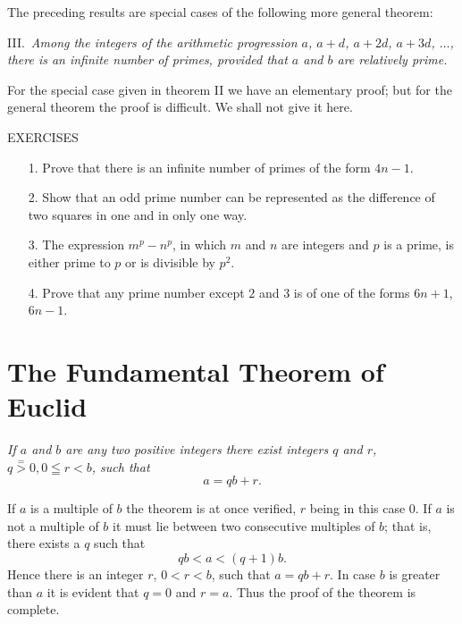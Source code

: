 \documentclass[oneside]{book}
\begin{document}
The preceding results are special cases of the following more
general theorem:

\smallskip III.~\emph{Among the integers of the arithmetic
progression $a$, $a + d$, $a + 2d$, $a + 3d$, $\ldots$, there is an
infinite number of
primes, provided that $a$ and $b$ are relatively prime.}%

For the special case given in theorem II we have an elementary
proof; but for the general theorem the proof is difficult. We shall
not give it here.

\begin{center}
EXERCISES
\end{center}

\small \begin{enumerate}

\item[1.] Prove that there is an infinite number of primes of the
form $4n - 1$.

\item[2.] Show that an odd prime number can be represented as the
difference of two squares in one and in only one way.

\item[3.] The expression $m^p - n^p$, in which $m$ and $n$ are integers
and $p$ is a prime, is either prime to $p$ or is divisible by $p^2$.

\item[4.] Prove that any prime number except $2$ and $3$ is of one of
the forms $6n + 1$, $6n - 1$.
\end{enumerate}\normalsize

\section{The Fundamental Theorem of Euclid}\label{s5}%

\emph{If $a$ and $b$ are any two positive integers there exist
integers $q$ and $r$, $q\stackrel{=}{>} 0, 0 \leqq r < b$, such
that}
\begin{equation*}
a = qb + r.
\end{equation*}

If $a$ is a multiple of $b$ the theorem is at once verified, $r$
being in this case $0$. If $a$ is not a multiple of $b$ it must lie
between two consecutive multiples of $b$; that is, there exists a
$q$ such that
\begin{equation*}
qb < a < (q + 1)b.
\end{equation*}
Hence there is an integer $r$, $0 < r < b$, such that $a = qb + r$.
In case $b$ is greater than $a$ it is evident that $q = 0$ and $r =
a$. Thus the proof of the theorem is complete.
\end{document}
